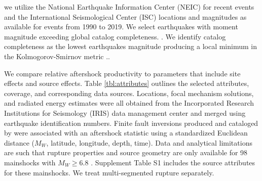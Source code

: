 \documentclass[draft, jgrga]{agujournal2018}
\begin{document}
 we utilize the National Earthquake Information Center (NEIC) for recent events and the International Seismological Center (ISC) locations and magnitudes as available for events from 1990 to 2019. We select earthquakes with moment magnitude exceeding global catalog completeness. . We identify catalog completeness as the lowest earthquakes magnitude producing a local minimum in the Kolmogorov-Smirnov metric \citep[following][]{Clauset2009Power-lawData, Goebel2017WhatExperiments}.. 


We compare relative aftershock productivity to parameters that include site effects and source effects. Table \ref{tbl:attributes} outlines the selected attributes, coverage, and corresponding data sources. Locations, focal mechanism solutions, and radiated energy estimates were all obtained from the Incorporated Research Institutions for Seismology (IRIS) data management center and merged using earthquake identification numbers. Finite fault inversions produced and cataloged by \citet{Hayes2017} were associated with an aftershock statistic using a standardized Euclidean distance ($M_W$, latitude, longitude, depth, time).
Data and analytical limitations are such that rupture properties and source geometry are only available for 98 mainshocks with $M_W\ge6.8$ \citep{Hayes2017}. Supplement Table S1 includes the source attributes for these mainshocks. We treat multi-segmented rupture separately.
\end{document}
